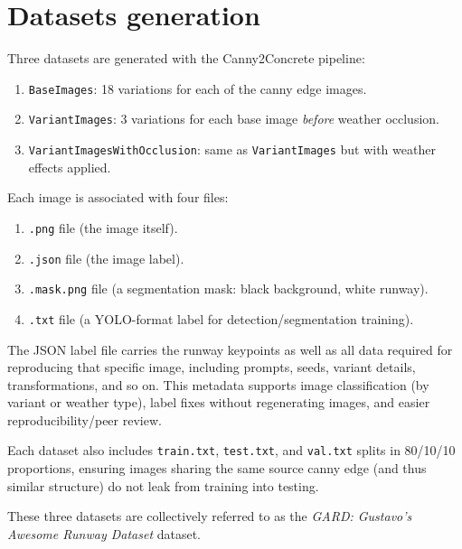\section{Datasets generation}

Three datasets are generated with the Canny2Concrete pipeline:

\begin{enumerate}
\item \texttt{BaseImages}: 18 variations for each of the canny edge images.
\item \texttt{VariantImages}: 3 variations for each base image \emph{before} weather occlusion.
\item \texttt{VariantImagesWithOcclusion}: same as \texttt{VariantImages} but with weather effects applied.
\end{enumerate}

Each image is associated with four files:
\begin{enumerate}
\item \texttt{.png} file (the image itself).
\item \texttt{.json} file (the image label).
\item \texttt{.mask.png} file (a segmentation mask: black background, white runway).
\item \texttt{.txt} file (a YOLO-format label for detection/segmentation training).
\end{enumerate}

The JSON label file carries the runway keypoints as well as all data required for reproducing that specific image, including prompts, seeds, variant details, transformations, and so on. 
This metadata supports image classification (by variant or weather type), label fixes without regenerating images, and easier reproducibility/peer review.

Each dataset also includes \texttt{train.txt}, \texttt{test.txt}, and \texttt{val.txt} splits in 80/10/10 proportions, ensuring images sharing the same source canny edge (and thus similar structure) do not leak from training into testing.

These three datasets are collectively referred to as the \emph{GARD: Gustavo’s Awesome Runway Dataset} dataset.
